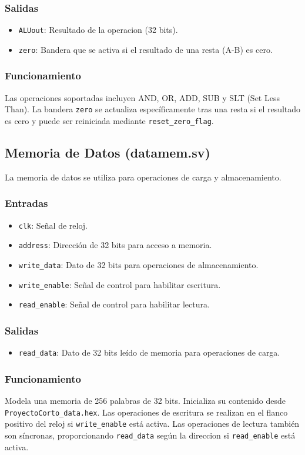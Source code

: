 \documentclass[conference]{IEEEtran}
\begin{document}
\subsubsection{Salidas}
\begin{itemize}
    \item \texttt{ALUout}: Resultado de la operacion (32 bits).
    \item \texttt{zero}: Bandera que se activa si el resultado de una resta (A-B) es cero.
\end{itemize}
\subsubsection{Funcionamiento}
Las operaciones soportadas incluyen AND, OR, ADD, SUB y SLT (Set Less Than). La bandera \texttt{zero} se actualiza específicamente tras una resta si el resultado es cero y puede ser reiniciada mediante \texttt{reset\_zero\_flag}.

\subsection{Memoria de Datos (datamem.sv)}
La memoria de datos se utiliza para operaciones de carga y almacenamiento.
\subsubsection{Entradas}
\begin{itemize}
    \item \texttt{clk}: Señal de reloj.
    \item \texttt{address}: Dirección de 32 bits para acceso a memoria.
    \item \texttt{write\_data}: Dato de 32 bits para operaciones de almacenamiento.
    \item \texttt{write\_enable}: Señal de control para habilitar escritura.
    \item \texttt{read\_enable}: Señal de control para habilitar lectura.
\end{itemize}
\subsubsection{Salidas}
\begin{itemize}
    \item \texttt{read\_data}: Dato de 32 bits leído de memoria para operaciones de carga.
\end{itemize}
\subsubsection{Funcionamiento}
Modela una memoria de 256 palabras de 32 bits. Inicializa su contenido desde \texttt{ProyectoCorto\_data.hex}. Las operaciones de escritura se realizan en el flanco positivo del reloj si \texttt{write\_enable} está activa. Las operaciones de lectura también son síncronas, proporcionando \texttt{read\_data} según la direccion si \texttt{read\_enable} está activa.
\end{document}
